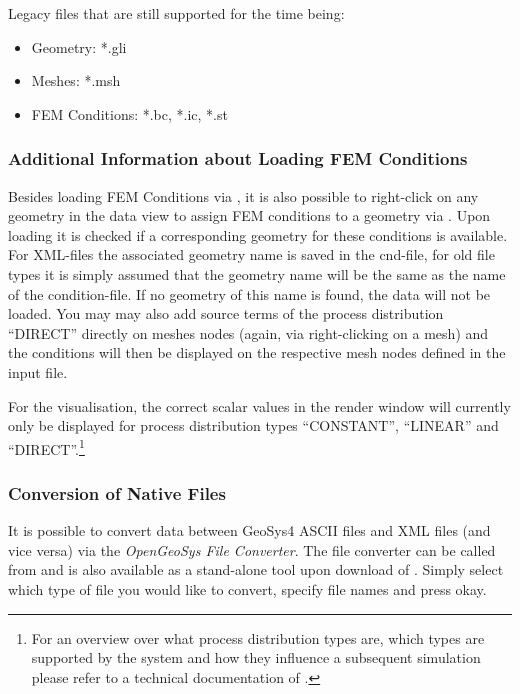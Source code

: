 Legacy files that are still supported for the time being:
\begin{itemize}
\item Geometry: *.gli
\item Meshes: *.msh
\item FEM Conditions: *.bc, *.ic, *.st
\end{itemize}


\subsubsection{Additional Information about Loading FEM Conditions}

Besides loading FEM Conditions via  , it is also possible to right-click on any geometry in the data view to assign FEM conditions to a geometry via . Upon loading it is checked if a corresponding geometry for these conditions is available. For XML-files the associated geometry name is saved in the cnd-file, for old file types it is simply assumed that the geometry name will be the same as the name of the condition-file. If no geometry of this name is found, the data will not be loaded. You may may also add source terms of the process distribution ``DIRECT'' directly on meshes nodes (again, via right-clicking on a mesh) and the conditions will then be displayed on the respective mesh nodes defined in the input file.

For the visualisation, the correct scalar values in the render window will currently only be displayed for process distribution types ``CONSTANT'', ``LINEAR'' and ``DIRECT''.\footnote{For an overview over what process distribution types are, which types are supported by the system and how they influence a subsequent simulation please refer to a technical documentation of \ogs.}

\subsubsection{Conversion of Native Files}
\label{FileConverter}

It is possible to convert data between GeoSys4 ASCII files and \ogs XML files (and vice versa) via the \emph{OpenGeoSys File Converter}. The file converter can be called from  and is also available as a stand-alone tool upon download of \ogs. Simply select which type of file you would like to convert, specify file names and press okay.

